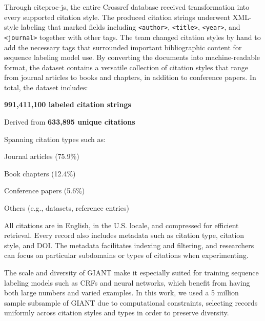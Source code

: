 Through citeproc-js, the entire Crossref database received transformation into every supported citation style. The produced citation strings underwent XML-style labeling that marked fields including \texttt{<author>}, \texttt{<title>}, \texttt{<year>}, and \texttt{<journal>} together with other tags. The team changed citation styles by hand to add the necessary tags that surrounded important bibliographic content for sequence labeling model use. By converting the documents into machine-readable format, the dataset contains a versatile collection of citation styles that range from journal articles to books and chapters, in addition to conference papers.
In total, the dataset includes:
\begin{compactitem}
\item \textbf{991,411,100 labeled citation strings}
\item Derived from \textbf{633,895 unique citations}
\item Spanning citation types such as:
\begin{compactitem}
\item Journal articles (75.9\%)
\item Book chapters (12.4\%)
\item Conference papers (5.6\%)
\item Others (e.g., datasets, reference entries)
\end{compactitem}
\end{compactitem}

All citations are in English, in the U.S. locale, and compressed for efficient retrieval. Every record also includes metadata such as citation type, citation style, and DOI. The metadata facilitates indexing and filtering, and researchers can focus on particular subdomains or types of citations when experimenting.

The scale and diversity of GIANT make it especially suited for training sequence labeling models such as CRFs and neural networks, which benefit from having both large numbers and varied examples. In this work, we used a 5 million sample subsample of GIANT due to computational constraints, selecting records uniformly across citation styles and types in order to preserve diversity.

